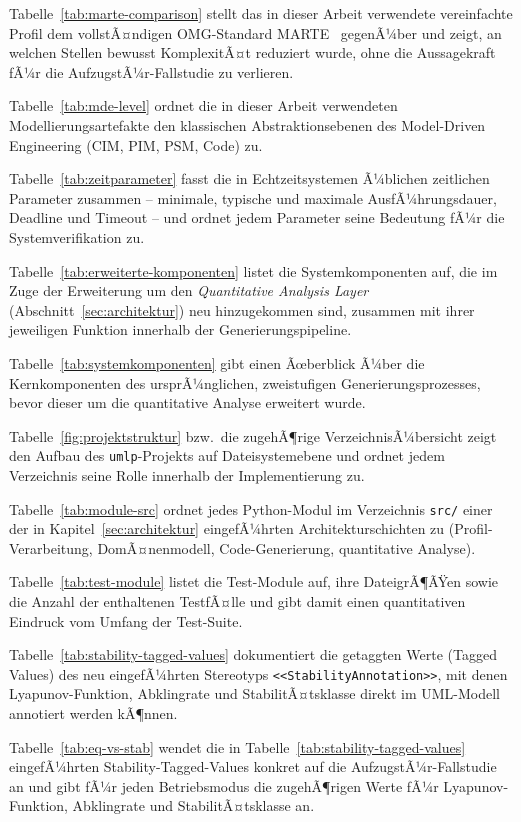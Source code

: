 ﻿\documentclass[a4paper,12pt]{report}
\theoremstyle{definition}
\begin{document}
Tabelle~\ref{tab:marte-comparison} stellt das in dieser Arbeit verwendete vereinfachte Profil dem vollstÃ¤ndigen OMG-Standard MARTE~\cite{marte} gegenÃ¼ber und zeigt, an welchen Stellen bewusst KomplexitÃ¤t reduziert wurde, ohne die Aussagekraft fÃ¼r die AufzugstÃ¼r-Fallstudie zu verlieren.

Tabelle~\ref{tab:mde-level} ordnet die in dieser Arbeit verwendeten Modellierungsartefakte den klassischen Abstraktionsebenen des Model-Driven Engineering (CIM, PIM, PSM, Code) zu.

Tabelle~\ref{tab:zeitparameter} fasst die in Echtzeitsystemen Ã¼blichen zeitlichen Parameter zusammen -- minimale, typische und maximale AusfÃ¼hrungsdauer, Deadline und Timeout -- und ordnet jedem Parameter seine Bedeutung fÃ¼r die Systemverifikation zu.

Tabelle~\ref{tab:erweiterte-komponenten} listet die Systemkomponenten auf, die im Zuge der Erweiterung um den \textit{Quantitative Analysis Layer} (Abschnitt~\ref{sec:architektur}) neu hinzugekommen sind, zusammen mit ihrer jeweiligen Funktion innerhalb der Generierungspipeline.

Tabelle~\ref{tab:systemkomponenten} gibt einen Ãœberblick Ã¼ber die Kernkomponenten des ursprÃ¼nglichen, zweistufigen Generierungsprozesses, bevor dieser um die quantitative Analyse erweitert wurde.

Tabelle~\ref{fig:projektstruktur} bzw.\ die zugehÃ¶rige VerzeichnisÃ¼bersicht zeigt den Aufbau des \texttt{umlp}-Projekts auf Dateisystemebene und ordnet jedem Verzeichnis seine Rolle innerhalb der Implementierung zu.

Tabelle~\ref{tab:module-src} ordnet jedes Python-Modul im Verzeichnis \texttt{src/} einer der in Kapitel~\ref{sec:architektur} eingefÃ¼hrten Architekturschichten zu (Profil-Verarbeitung, DomÃ¤nenmodell, Code-Generierung, quantitative Analyse).

Tabelle~\ref{tab:test-module} listet die Test-Module auf, ihre DateigrÃ¶ÃŸen sowie die Anzahl der enthaltenen TestfÃ¤lle und gibt damit einen quantitativen Eindruck vom Umfang der Test-Suite.

Tabelle~\ref{tab:stability-tagged-values} dokumentiert die getaggten Werte (Tagged Values) des neu eingefÃ¼hrten Stereotyps \texttt{<<StabilityAnnotation>>}, mit denen Lyapunov-Funktion, Abklingrate und StabilitÃ¤tsklasse direkt im UML-Modell annotiert werden kÃ¶nnen.

Tabelle~\ref{tab:eq-vs-stab} wendet die in Tabelle~\ref{tab:stability-tagged-values} eingefÃ¼hrten Stability-Tagged-Values konkret auf die AufzugstÃ¼r-Fallstudie an und gibt fÃ¼r jeden Betriebsmodus die zugehÃ¶rigen Werte fÃ¼r Lyapunov-Funktion, Abklingrate und StabilitÃ¤tsklasse an.
\end{document}
